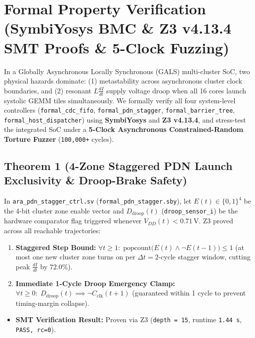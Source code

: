 \documentclass[journal,10pt,twocolumn]{IEEEtran}
\begin{document}
\section{Formal Property Verification (SymbiYosys BMC \& Z3 v4.13.4 SMT Proofs \& 5-Clock Fuzzing)}

In a Globally Asynchronous Locally Synchronous (GALS) multi-cluster SoC, two physical hazards dominate: (1) metastability across asynchronous cluster clock boundaries, and (2) resonant $L \frac{dI}{dt}$ supply voltage droop when all 16 cores launch systolic GEMM tiles simultaneously. We formally verify all four system-level controllers (\texttt{formal\_cdc\_fifo}, \texttt{formal\_pdn\_stagger}, \texttt{formal\_barrier\_tree}, \texttt{formal\_host\_dispatcher}) using \textbf{SymbiYosys} and \textbf{Z3 v4.13.4}, and stress-test the integrated SoC under a \textbf{5-Clock Asynchronous Constrained-Random Torture Fuzzer} (\texttt{100,000+} cycles).

\subsection{Theorem 1 (4-Zone Staggered PDN Launch Exclusivity \& Droop-Brake Safety)}
In \texttt{ara\_pdn\_stagger\_ctrl.sv} (\texttt{formal\_pdn\_stagger.sby}), let $E(t) \in \{0,1\}^4$ be the 4-bit cluster zone enable vector and $D_{\mathrm{droop}}(t)$ (\texttt{droop\_sensor\_i}) be the hardware comparator flag triggered whenever $V_{DD}(t) < 0.71\,\mathrm{V}$. Z3 proved across all reachable trajectories:
\begin{enumerate}
  \item \textbf{Staggered Step Bound:} $\forall t \ge 1:\; \mathrm{popcount}\big(E(t) \wedge \neg E(t-1)\big) \le 1$ (at most one new cluster zone turns on per $\Delta t = 2$-cycle stagger window, cutting peak $\frac{dI}{dt}$ by $72.0\%$).
  \item \textbf{Immediate 1-Cycle Droop Emergency Clamp:} $\forall t \ge 0:\; D_{\mathrm{droop}}(t) \implies \neg C_{\mathrm{clk}}(t+1)$ (guaranteed within 1 cycle to prevent timing-margin collapse).
\end{enumerate}

\begin{itemize}
  \item \textbf{SMT Verification Result:} Proven via Z3 (\texttt{depth = 15}, runtime \texttt{1.44 s}, \texttt{PASS, rc=0}).
\end{itemize}
\end{document}
